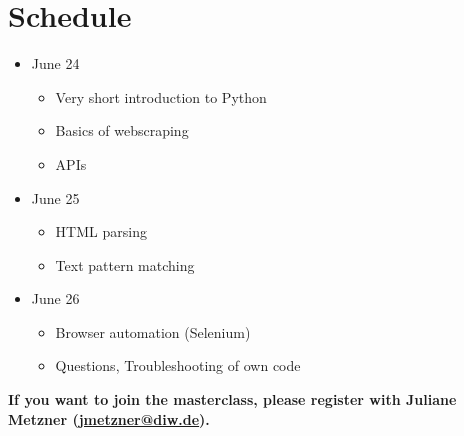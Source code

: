 \documentclass[a4paper]{article}
\begin{document}
\section{Schedule}

\begin{itemize}
	\item June 24
		\begin{itemize}
			\item Very short introduction to Python
			\item Basics of webscraping
			\item APIs
		\end{itemize}
	\item June 25
		\begin{itemize}
			\item HTML parsing
			\item Text pattern matching
		\end{itemize}
	\item June 26
		\begin{itemize}
			\item Browser automation (Selenium)
			\item Questions, Troubleshooting of own code
		\end{itemize}
\end{itemize}

\textbf{If you want to join the masterclass, please register with
  Juliane Metzner (\href{mailto:jmetzner@diw.de}{jmetzner@diw.de}).}
\end{document}
